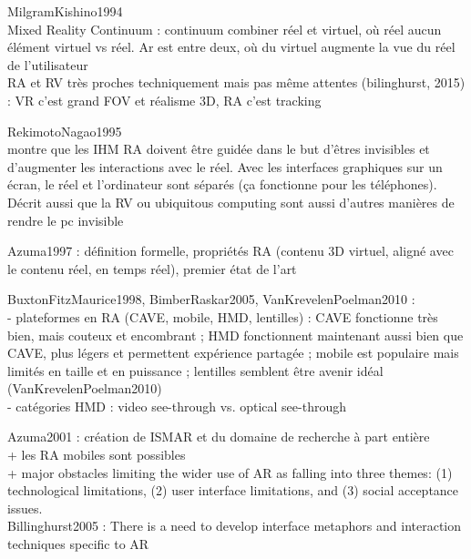 
MilgramKishino1994\\
Mixed Reality Continuum : continuum combiner réel et virtuel, où réel aucun élément virtuel vs réel. Ar est entre deux, où du virtuel augmente la vue du réel de l'utilisateur\\
RA et RV très proches techniquement mais pas même attentes (bilinghurst, 2015) : VR c'est grand FOV et réalisme 3D, RA c'est tracking

RekimotoNagao1995\\
montre que les IHM RA doivent être guidée dans le but d'êtres invisibles et d'augmenter les interactions avec le réel. Avec les interfaces graphiques sur un écran, le réel et l'ordinateur sont séparés (ça fonctionne pour les téléphones). Décrit aussi que la RV ou ubiquitous computing sont aussi d'autres manières de rendre le pc invisible

Azuma1997 : définition formelle, propriétés RA (contenu 3D virtuel, aligné avec le contenu réel, en temps réel), premier état de l'art

BuxtonFitzMaurice1998, BimberRaskar2005, VanKrevelenPoelman2010 :\\
- plateformes en RA (CAVE, mobile, HMD, lentilles) : CAVE fonctionne très bien, mais couteux et encombrant ; HMD fonctionnent maintenant aussi bien que CAVE, plus légers et permettent expérience partagée ; mobile est populaire mais limités en taille et en puissance ; lentilles semblent être avenir idéal (VanKrevelenPoelman2010)\\
- catégories HMD : video see-through vs. optical see-through


Azuma2001 : création de ISMAR et du domaine de recherche à part entière\\
+ les RA mobiles sont possibles\\
+ major obstacles limiting the wider use of AR as falling into three themes: (1) technological limitations, (2) user interface limitations, and (3) social acceptance issues.\\
Billinghurst2005 : There is a need to develop interface metaphors and interaction techniques specific to AR

